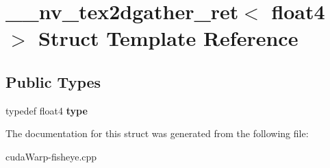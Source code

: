 \hypertarget{struct____nv__tex2dgather__ret_3_01float4_01_4}{}\section{\+\_\+\+\_\+nv\+\_\+tex2dgather\+\_\+ret$<$ float4 $>$ Struct Template Reference}
\label{struct____nv__tex2dgather__ret_3_01float4_01_4}
\subsection*{Public Types}
\begin{DoxyCompactItemize}
\item 
typedef float4 {\bfseries type}\hypertarget{struct____nv__tex2dgather__ret_3_01float4_01_4_a65c0b20bff0a15d74a76ce6cbc8ed49b}{}\label{struct____nv__tex2dgather__ret_3_01float4_01_4_a65c0b20bff0a15d74a76ce6cbc8ed49b}

\end{DoxyCompactItemize}


The documentation for this struct was generated from the following file\+:\begin{DoxyCompactItemize}
\item 
cuda\+Warp-\/fisheye.\+cpp\end{DoxyCompactItemize}
